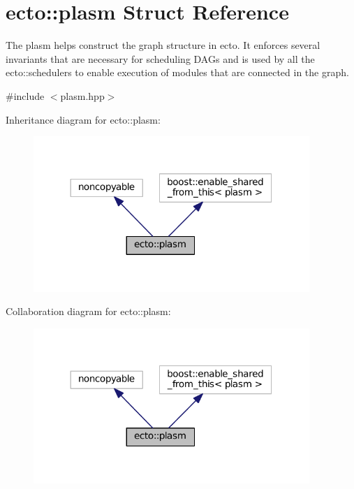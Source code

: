 \hypertarget{structecto_1_1plasm}{}\section{ecto\+:\+:plasm Struct Reference}
\label{structecto_1_1plasm}


The plasm helps construct the graph structure in ecto. It enforces several invariants that are necessary for scheduling D\+A\+Gs and is used by all the ecto\+::schedulers to enable execution of modules that are connected in the graph.  




{\ttfamily \#include $<$plasm.\+hpp$>$}



Inheritance diagram for ecto\+:\+:plasm\+:\nopagebreak
\begin{figure}[H]
\begin{center}
\leavevmode
\includegraphics[width=296pt]{structecto_1_1plasm__inherit__graph}
\end{center}
\end{figure}


Collaboration diagram for ecto\+:\+:plasm\+:\nopagebreak
\begin{figure}[H]
\begin{center}
\leavevmode
\includegraphics[width=296pt]{structecto_1_1plasm__coll__graph}
\end{center}
\end{figure}
